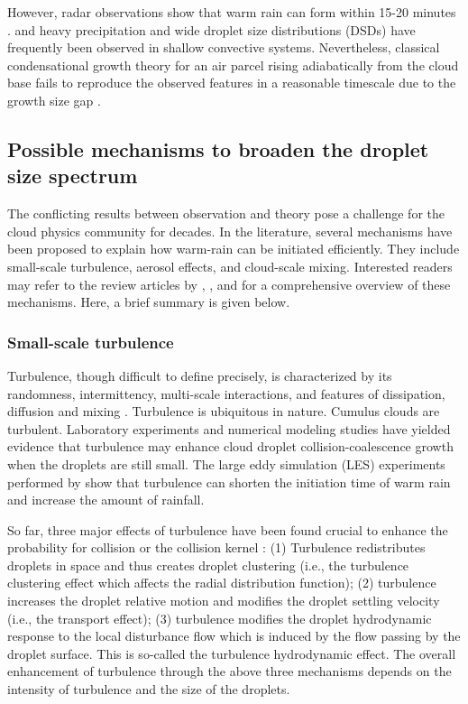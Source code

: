 However, radar observations show that warm rain can form within 15-20 minutes \citep{Szumowski1997, Knight2002, Goke2007}. and heavy precipitation \citep{Stevens2016} and wide droplet size distributions (DSDs) \citep{Warner1969, GRL2017,Siebert2017, Witte2017} have frequently been observed in shallow convective systems. Nevertheless, classical condensational growth theory for an air parcel rising adiabatically from the cloud base fails to reproduce the observed features in a reasonable timescale due to the growth size gap \citep{Jonas1996}.

\subsection{Possible mechanisms to broaden the droplet size spectrum}

The conflicting results between observation and theory pose a challenge for the cloud physics community for decades. In the literature, several mechanisms have been proposed to explain how warm-rain can be initiated efficiently. They include small-scale turbulence, aerosol effects, and cloud-scale mixing. Interested readers may refer to the review articles by \citet{Vaillancourt2000}, \citet{Devenish2012}, and \citet{Grabowski2013} for a comprehensive overview of these mechanisms. Here, a brief summary is given below.

\subsubsection{Small-scale turbulence}

Turbulence, though difficult to define precisely, is characterized by its randomness, intermittency, multi-scale interactions, and features of dissipation, diffusion and mixing \citep{TL1972}. Turbulence is ubiquitous in nature. Cumulus clouds are turbulent. Laboratory experiments \citep[e.g., ][]{Bordas2013} and numerical modeling studies \citep[e.g., ][]{Wang2000, Wang2008} have yielded evidence that turbulence may enhance cloud droplet collision-coalescence growth when the droplets are still small. The large eddy simulation (LES) experiments performed by \citet{Wyszogrodzki2013} show that turbulence can shorten the initiation time of warm rain and increase the amount of rainfall. 

So far, three major effects of turbulence have been found crucial to enhance the probability for collision or the collision kernel \citep{Wang2009}: 
(1) Turbulence redistributes droplets in space and thus creates droplet clustering (i.e., the turbulence clustering effect which affects the radial distribution function); (2) turbulence increases the droplet relative motion and modifies the droplet settling velocity (i.e., the transport effect); (3) turbulence modifies the droplet hydrodynamic response to the local disturbance flow which is induced by the flow passing by the droplet surface. This is so-called the turbulence hydrodynamic effect. The overall enhancement of turbulence through the above three mechanisms depends on the intensity of turbulence and the size of the droplets. 

